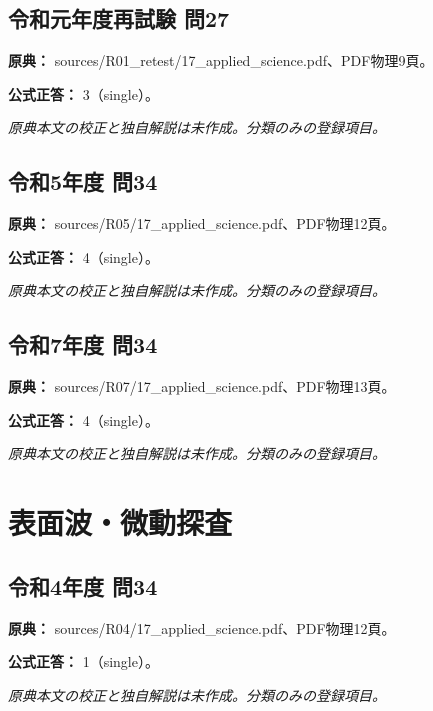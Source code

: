 \subsection{令和元年度再試験 問27}
\label{q:r01-ret-applied-27}

\noindent\textbf{原典：} sources/R01\_retest/17\_applied\_science.pdf、PDF物理9頁。

\textbf{公式正答：} 3（single）。

\par\textit{原典本文の校正と独自解説は未作成。分類のみの登録項目。}

\subsection{令和5年度 問34}
\label{q:r05-reg-applied-34}

\noindent\textbf{原典：} sources/R05/17\_applied\_science.pdf、PDF物理12頁。

\textbf{公式正答：} 4（single）。

\par\textit{原典本文の校正と独自解説は未作成。分類のみの登録項目。}

\subsection{令和7年度 問34}
\label{q:r07-reg-applied-34}

\noindent\textbf{原典：} sources/R07/17\_applied\_science.pdf、PDF物理13頁。

\textbf{公式正答：} 4（single）。

\par\textit{原典本文の校正と独自解説は未作成。分類のみの登録項目。}

\section{表面波・微動探査}

\subsection{令和4年度 問34}
\label{q:r04-reg-applied-34}

\noindent\textbf{原典：} sources/R04/17\_applied\_science.pdf、PDF物理12頁。

\textbf{公式正答：} 1（single）。

\par\textit{原典本文の校正と独自解説は未作成。分類のみの登録項目。}

